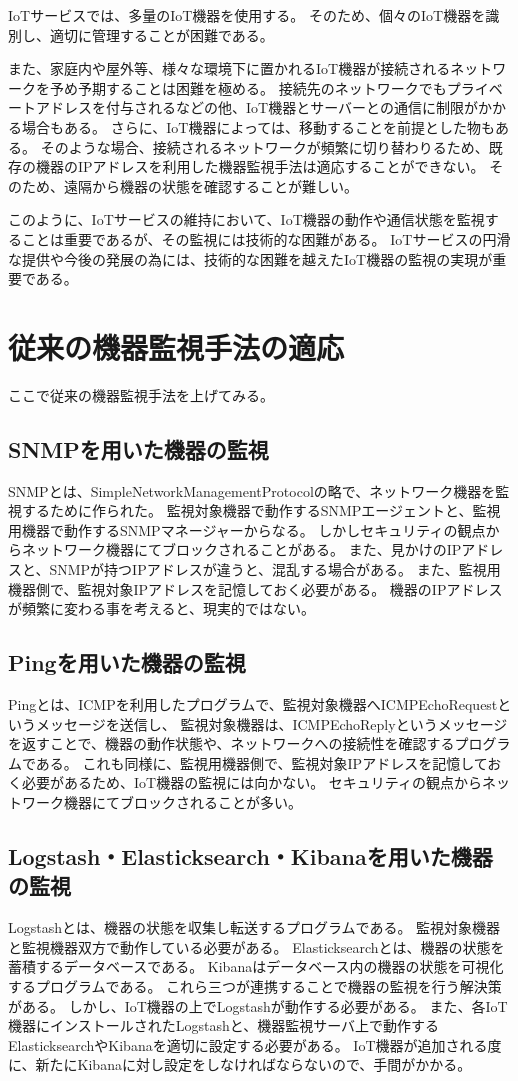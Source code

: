 IoTサービスでは、多量のIoT機器を使用する。
そのため、個々のIoT機器を識別し、適切に管理することが困難である。
\medskip

また、家庭内や屋外等、様々な環境下に置かれるIoT機器が接続されるネットワークを予め予期することは困難を極める。
接続先のネットワークでもプライベートアドレスを付与されるなどの他、IoT機器とサーバーとの通信に制限がかかる場合もある。
さらに、IoT機器によっては、移動することを前提とした物もある。
そのような場合、接続されるネットワークが頻繁に切り替わりるため、既存の機器のIPアドレスを利用した機器監視手法は適応することができない。
そのため、遠隔から機器の状態を確認することが難しい。
\medskip

このように、IoTサービスの維持において、IoT機器の動作や通信状態を監視することは重要であるが、その監視には技術的な困難がある。
IoTサービスの円滑な提供や今後の発展の為には、技術的な困難を越えたIoT機器の監視の実現が重要である。


\section{従来の機器監視手法の適応}
ここで従来の機器監視手法を上げてみる。
\subsection{SNMPを用いた機器の監視}
	SNMPとは、SimpleNetworkManagementProtocolの略で、ネットワーク機器を監視するために作られた。
	監視対象機器で動作するSNMPエージェントと、監視用機器で動作するSNMPマネージャーからなる。
	しかしセキュリティの観点からネットワーク機器にてブロックされることがある。
	また、見かけのIPアドレスと、SNMPが持つIPアドレスが違うと、混乱する場合がある。
	また、監視用機器側で、監視対象IPアドレスを記憶しておく必要がある。
	機器のIPアドレスが頻繁に変わる事を考えると、現実的ではない。
\subsection{Pingを用いた機器の監視}
	Pingとは、ICMPを利用したプログラムで、監視対象機器へICMPEchoRequestというメッセージを送信し、
	監視対象機器は、ICMPEchoReplyというメッセージを返すことで、機器の動作状態や、ネットワークへの接続性を確認するプログラムである。
	これも同様に、監視用機器側で、監視対象IPアドレスを記憶しておく必要があるため、IoT機器の監視には向かない。
	セキュリティの観点からネットワーク機器にてブロックされることが多い。
\subsection{Logstash・Elasticksearch・Kibanaを用いた機器の監視}
	Logstashとは、機器の状態を収集し転送するプログラムである。
	監視対象機器と監視機器双方で動作している必要がある。
	Elasticksearchとは、機器の状態を蓄積するデータベースである。
	Kibanaはデータベース内の機器の状態を可視化するプログラムである。
	これら三つが連携することで機器の監視を行う解決策がある。
	しかし、IoT機器の上でLogstashが動作する必要がある。
	また、各IoT機器にインストールされたLogstashと、機器監視サーバ上で動作するElasticksearchやKibanaを適切に設定する必要がある。
	IoT機器が追加される度に、新たにKibanaに対し設定をしなければならないので、手間がかかる。
